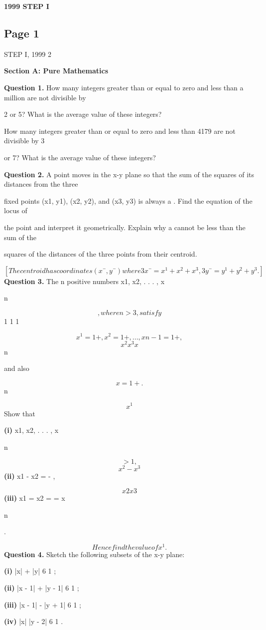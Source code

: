 \documentclass[12pt]{article}
\begin{document}
\begin{center}
{\Large \textbf{1999 STEP I}}
\end{center}

\subsection*{Page 1}
\begin{flushleft}
STEP I, 1999 2\par
\bigskip\textbf{Section A: Pure Mathematics}\par
\bigskip\textbf{Question 1.} How many integers greater than or equal to zero and less than a million are not divisible by\par
2 or 5? What is the average value of these integers?\par
How many integers greater than or equal to zero and less than 4179 are not divisible by 3\par
or 7? What is the average value of these integers?\par
\bigskip\textbf{Question 2.} A point moves in the x-y plane so that the sum of the squares of its distances from the three\par
fixed points (x1, y1), (x2, y2), and (x3, y3) is always a . Find the equation of the locus of\par
the point and interpret it geometrically. Explain why a cannot be less than the sum of the\par
squares of the distances of the three points from their centroid.\par
\[[The centroid has coordinates (x¯, y¯) where 3x¯ = x^1 + x^2 + x^3, 3y¯ = y^1 + y^2 + y^3. ]\]
\bigskip\textbf{Question 3.} The n positive numbers x1, x2, . . . , x\par
n\par
\[, where n > 3, satisfy\]
1 1 1\par
\[x^1 = 1 + , x^2 = 1 + , . . . , x n-1 = 1 + ,\]
\[x^2 x^3 x\]
n\par
and also\par
\[x = 1 + .\]
n\par
\[x^1\]
Show that\par
\textbf{(i)} x1, x2, . . . , x\par
n\par
\[> 1,\]
\[x^2 - x^3\]
\textbf{(ii)} x1 - x2 = - ,\par
\[x2x3\]
\textbf{(iii)} x1 = x2 = \cdots = x\par
n\par
.\par
\[Hence find the value of x^1.\]
\bigskip\textbf{Question 4.} Sketch the following subsets of the x-y plane:\par
\textbf{(i)} |x| + |y| 6 1 ;\par
\textbf{(ii)} |x - 1| + |y - 1| 6 1 ;\par
\textbf{(iii)} |x - 1| - |y + 1| 6 1 ;\par
\textbf{(iv)} |x| |y - 2| 6 1 .\par
\end{flushleft}
\end{document}
